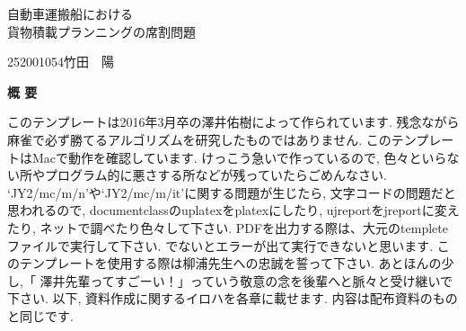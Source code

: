 \begin{center}
{\LARGE 自動車運搬船における \\ 貨物積載プランニングの席割問題}\\[0.5cm]
\end{center}
\hfill
{\large 252001054\qquad 竹田　陽}\\[0.5cm]
\begin{center}
{\Large \bf 概 要}\\
\end{center}

このテンプレートは2016年3月卒の澤井佑樹によって作られています.
残念ながら麻雀で必ず勝てるアルゴリズムを研究したものではありません.
このテンプレートはMacで動作を確認しています.
けっこう急いで作っているので, 色々といらない所やプログラム的に悪さする所などが残っていたらごめんなさい.
`JY2/mc/m/n'や`JY2/mc/m/it'に関する問題が生じたら, 文字コードの問題だと思われるので,
documentclassのuplatexをplatexにしたり, ujreportをjreportに変えたり, ネットで調べたり色々して下さい.
PDFを出力する際は、大元のtempleteファイルで実行して下さい.
でないとエラーが出て実行できないと思います.
このテンプレートを使用する際は柳浦先生への忠誠を誓って下さい.
あとほんの少し,「 澤井先輩ってすごーい！」っていう敬意の念を後輩へと脈々と受け継いで下さい.
以下, 資料作成に関するイロハを各章に載せます.
内容は配布資料のものと同じです.
